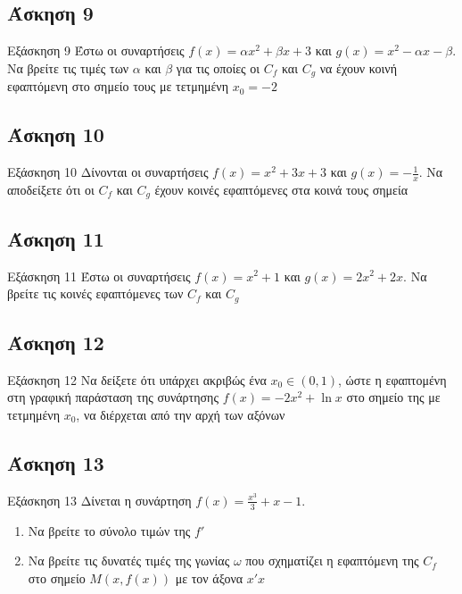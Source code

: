 \documentclass[greek]{beamer}
\begin{document}
\subsection{Άσκηση 9}
\begin{frame}[label=Άσκηση9]{Εξάσκηση 9}
  Έστω οι συναρτήσεις $f(x)=αx^2+βx+3$ και $g(x)=x^2-αx-β$. Να βρείτε τις τιμές των $α$ και $β$ για τις οποίες οι $C_f$ και $C_g$ να έχουν κοινή εφαπτόμενη στο σημείο τους με τετμημένη $x_0=-2$

\end{frame}

\subsection{Άσκηση 10}
\begin{frame}[label=Άσκηση10]{Εξάσκηση 10}
  Δίνονται οι συναρτήσεις $f(x)=x^2+3x+3$ και $g(x)=-\frac{1}{x}$. Να αποδείξετε ότι οι $C_f$ και $C_g$ έχουν κοινές εφαπτόμενες στα κοινά τους σημεία

\end{frame}

\subsection{Άσκηση 11}
\begin{frame}[label=Άσκηση11]{Εξάσκηση 11}
  Έστω οι συναρτήσεις $f(x)=x^2+1$ και $g(x)=2x^2+2x$. Να βρείτε τις κοινές εφαπτόμενες των $C_f$ και $C_g$

\end{frame}

\subsection{Άσκηση 12}
\begin{frame}[label=Άσκηση12]{Εξάσκηση 12}
  Να δείξετε ότι υπάρχει ακριβώς ένα $x_0\in (0,1)$, ώστε η εφαπτομένη στη γραφική παράσταση της συνάρτησης $f(x)=-2x^2+\ln x$ στο σημείο της με τετμημένη $x_0$, να διέρχεται από την αρχή των αξόνων

\end{frame}

\subsection{Άσκηση 13}
\begin{frame}[label=Άσκηση13]{Εξάσκηση 13}
  Δίνεται η συνάρτηση $f(x)=\frac{x^3}{3}+x-1$.
  \begin{enumerate}
    \item<1-> Να βρείτε το σύνολο τιμών της $f'$
    \item<2-> Να βρείτε τις δυνατές τιμές της γωνίας $ω$ που σχηματίζει η εφαπτόμενη της $C_f$ στο σημείο $Μ(x,f(x))$ με τον άξονα $x'x$
  \end{enumerate}

\end{frame}
\end{document}
